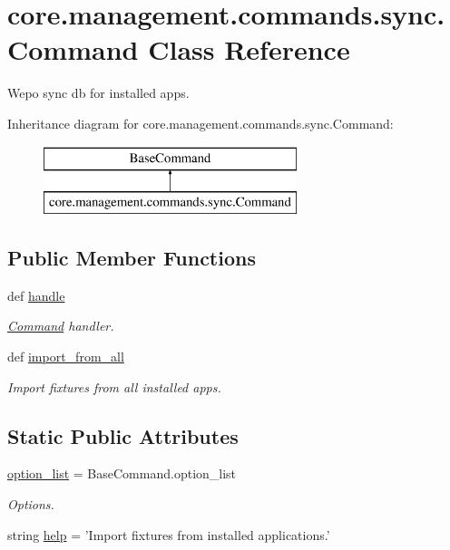 \hypertarget{classcore_1_1management_1_1commands_1_1sync_1_1Command}{\section{core.\-management.\-commands.\-sync.\-Command Class Reference}
\label{classcore_1_1management_1_1commands_1_1sync_1_1Command}
}


Wepo sync db for installed apps.  


Inheritance diagram for core.\-management.\-commands.\-sync.\-Command\-:\begin{figure}[H]
\begin{center}
\leavevmode
\includegraphics[height=2.000000cm]{classcore_1_1management_1_1commands_1_1sync_1_1Command}
\end{center}
\end{figure}
\subsection*{Public Member Functions}
\begin{DoxyCompactItemize}
\item 
def \hyperlink{classcore_1_1management_1_1commands_1_1sync_1_1Command_a3af67429e0e048166f4c2b551135456d}{handle}
\begin{DoxyCompactList}\small\item\em \hyperlink{classcore_1_1management_1_1commands_1_1sync_1_1Command}{Command} handler. \end{DoxyCompactList}\item 
def \hyperlink{classcore_1_1management_1_1commands_1_1sync_1_1Command_a84af1ad11a080e35037ca14f7042a085}{import\-\_\-from\-\_\-all}
\begin{DoxyCompactList}\small\item\em Import fixtures from all installed apps. \end{DoxyCompactList}\end{DoxyCompactItemize}
\subsection*{Static Public Attributes}
\begin{DoxyCompactItemize}
\item 
\hyperlink{classcore_1_1management_1_1commands_1_1sync_1_1Command_aa3316701d237502a5f8c7d5ddf038613}{option\-\_\-list} = Base\-Command.\-option\-\_\-list
\begin{DoxyCompactList}\small\item\em Options. \end{DoxyCompactList}\item 
string \hyperlink{classcore_1_1management_1_1commands_1_1sync_1_1Command_a6efa96168e0103973ca2824e8a51e5ad}{help} = 'Import fixtures from installed applications.'
\end{DoxyCompactItemize}


